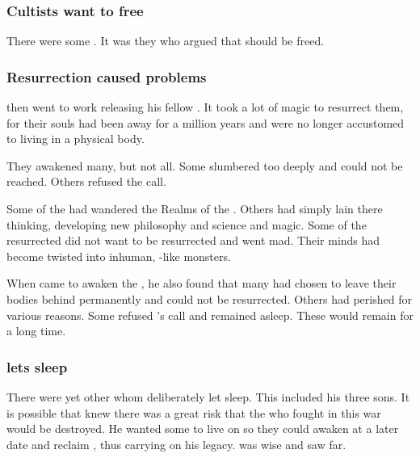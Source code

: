 \subsubsection{Cultists want to free \Sethicus}
There were some . 
It was they who argued that \Sethicus should be freed. 





\subsubsection{Resurrection caused problems}
\Sethicus then went to work releasing his fellow \dragons.
It took a lot of magic to resurrect them, for their souls had been away for a million years and were no longer accustomed to living in a physical body.

They awakened many, but not all.
Some slumbered too deeply and could not be reached.
Others refused the call.

Some of the \dragons had wandered the Realms of the \xss. 
Others had simply lain there thinking, developing new philosophy and science and magic.
Some of the resurrected \dragons did not want to be resurrected and went mad.
Their minds had become twisted into inhuman, \xs-like monsters.


When \Sethicus came to awaken the \dragons, he also found that many had chosen to leave their bodies behind permanently and could not be resurrected.
Others had perished for various reasons.
Some refused \Sethicus's call and remained asleep. 
These would remain  for a long time. 





\subsubsection{\Sethicus lets \Nexagglachel sleep}
There were yet other \dragons whom \Sethicus deliberately let sleep.
This included his three sons.
It is possible that \Sethicus knew there was a great risk that the \dragons who fought in this war would be destroyed. 
He wanted some \dragons to live on so they could awaken at a later date and reclaim \Miith, thus carrying on his legacy.
\Sethicus was wise and saw far.

